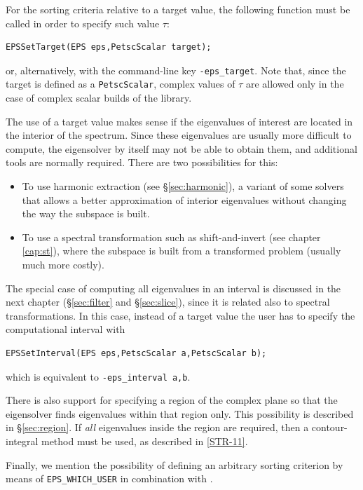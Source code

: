 	For the sorting criteria relative to a target value, the following function must be called in order to specify such value $\tau$:
	\begin{Verbatim}[fontsize=\small]
	EPSSetTarget(EPS eps,PetscScalar target);
	\end{Verbatim}
or, alternatively, with the command-line key \Verb!-eps_target!. Note that, since the target is defined as a \texttt{PetscScalar}, complex values of $\tau$ are allowed only in the case of complex scalar builds of the \slepc library.

The use of a target value makes sense if the eigenvalues of interest are located in the interior of the spectrum. Since these eigenvalues are usually more difficult to compute, the eigensolver by itself may not be able to obtain them, and additional tools are normally required.
There are two possibilities for this:
\begin{itemize}
\item To use harmonic extraction (see \S\ref{sec:harmonic}), a variant of some solvers that allows a better approximation of interior eigenvalues without changing the way the subspace is built.
\item To use a spectral transformation such as shift-and-invert (see chapter \ref{cap:st}), where the subspace is built from a transformed problem (usually much more costly).
\end{itemize}

The special case of computing all eigenvalues in an interval is discussed in the next chapter (\S\ref{sec:filter} and \S\ref{sec:slice}), since it is related also to spectral transformations. In this case, instead of a target value the user has to specify the computational interval with
	\begin{Verbatim}[fontsize=\small]
	EPSSetInterval(EPS eps,PetscScalar a,PetscScalar b);
	\end{Verbatim}
which is equivalent to \Verb!-eps_interval a,b!.

There is also support for specifying a region of the complex plane so that the eigensolver finds eigenvalues within that region only. This possibility is described in \S\ref{sec:region}. If \emph{all} eigenvalues inside the region are required, then a contour-integral method must be used, as described in \hyperlink{str}{[STR-11]}.

Finally, we mention the possibility of defining an arbitrary sorting criterion by means of \texttt{EPS\_WHICH\_USER} in combination with .

